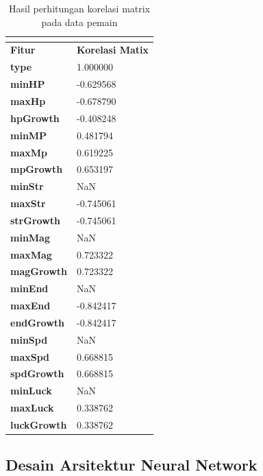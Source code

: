 \begin{longtable}{|l|l|}
	\caption{Hasil perhitungan korelasi matrix pada data pemain}
	\vspace{1ex}
	\label{tb:player_matrix_corel}\\
	\hline
	\rowcolor[HTML]{C0C0C0}
	\textbf{Fitur} & \textbf{Korelasi Matix} \\ \hline
	\textbf{type} & 1.000000 \\ \hline
	\textbf{minHP} & -0.629568 \\ \hline
	\textbf{maxHp} & -0.678790 \\ \hline
	\textbf{hpGrowth} & -0.408248 \\ \hline
	\textbf{minMP} & 0.481794 \\ \hline
	\textbf{maxMp} & 0.619225 \\ \hline
	\textbf{mpGrowth} & 0.653197 \\ \hline
	\textbf{minStr} & NaN \\ \hline
	\textbf{maxStr} & -0.745061 \\ \hline
	\textbf{strGrowth} & -0.745061 \\ \hline
	\textbf{minMag} & NaN \\ \hline
	\textbf{maxMag} & 0.723322 \\ \hline
	\textbf{magGrowth} & 0.723322 \\ \hline
	\textbf{minEnd} & NaN \\ \hline
	\textbf{maxEnd} & -0.842417 \\ \hline
	\textbf{endGrowth} & -0.842417 \\ \hline
	\textbf{minSpd} & NaN \\ \hline
	\textbf{maxSpd} & 0.668815 \\ \hline
	\textbf{spdGrowth} & 0.668815 \\ \hline
	\textbf{minLuck} & NaN \\ \hline
	\textbf{maxLuck} & 0.338762 \\ \hline
	\textbf{luckGrowth} & 0.338762 \\ \hline
\end{longtable}
\vspace{1ex}

\subsection{Desain Arsitektur Neural Network}
\label{sec:sub_sec3_player_arch}
\vspace{1ex}

